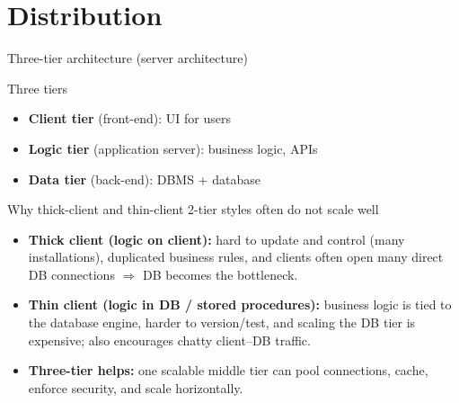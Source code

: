 \documentclass[10pt,aspectratio=169]{beamer}
\newenvironment{examplebox}[1][Example]{\begin{exampleblock}{#1}}{\end{exampleblock}}
\begin{document}
\section{Distribution}

\begin{frame}{Three-tier architecture (server architecture)}
\small
\begin{block}{Three tiers}
\begin{itemize}
  \item \textbf{Client tier} (front-end): UI for users
  \item \textbf{Logic tier} (application server): business logic, APIs
  \item \textbf{Data tier} (back-end): DBMS + database
\end{itemize}
\end{block}

\begin{examplebox}[Why thick-client and thin-client 2-tier styles often do not scale well]
\begin{itemize}
  \item \textbf{Thick client (logic on client):} hard to update and control (many installations), duplicated business rules, and clients often open many direct DB connections $\Rightarrow$ DB becomes the bottleneck.
  \item \textbf{Thin client (logic in DB / stored procedures):} business logic is tied to the database engine, harder to version/test, and scaling the DB tier is expensive; also encourages chatty client--DB traffic.
  \item \textbf{Three-tier helps:} one scalable middle tier can pool connections, cache, enforce security, and scale horizontally.
\end{itemize}
\end{examplebox}
\end{frame}
\end{document}

